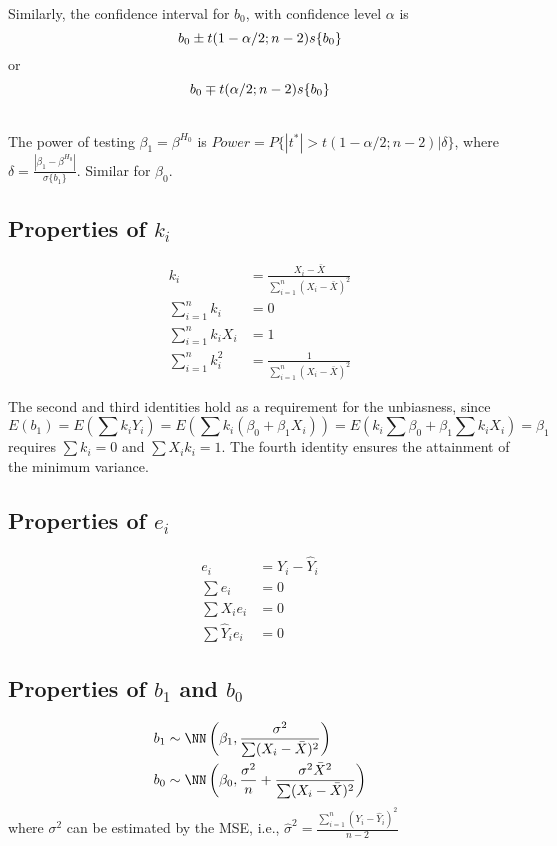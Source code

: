 \documentclass{memoir}
\begin{document}
Similarly, the confidence interval for $b_0$, with confidence level $\alpha$ is
\begin{equation}
	b_0 \pm t(1-\alpha/2;n-2)s\{b_0\}\\
\end{equation}
or
\begin{equation}
	b_0 \mp t(\alpha/2;n-2)s\{b_0\}\\
\end{equation}

\noindent
\\
The power of testing $\beta_1 = \beta^{H_0}$ is $Power = P\{|t^*|>t(1-\alpha/2;n-2)|\delta\}$, where $\delta = \frac{|\beta_1 - \beta^{H_0}|}{\sigma\{b_1\}}$. Similar for $\beta_0$.

\subsection{Properties of $k_i$}
\begin{align}
	k_i &= \frac{X_i - \bar X}{\sum_{i=1}^n (X_i-\bar X)^2}\\
	\sum_{i=1}^n k_i &= 0\\
	\sum_{i=1}^n k_i X_i &= 1\\
	\sum_{i=1}^n k_i^2 &= \frac{1}{\sum_{i=1}^n(X_i - \bar X)^2}
\end{align}

The second and third identities hold as a requirement for the unbiasness, since $$E(b_1) = E\left(\sum k_i Y_i\right)= E\left(\sum k_i (\beta_0+\beta_1 X_i)\right) = E\left(k_i \sum\beta_0 + \beta_1 \sum k_i X_i \right) = \beta_1$$ requires $\sum k_i = 0$  and $\sum X_i k_i = 1$.
The fourth identity ensures the attainment of the minimum variance.


\subsection{Properties of $e_i$}
\begin{align}
	e_i & = Y_i - \hat Y_i \\
	\sum e_i & = 0 \\
	\sum X_i e_i & = 0 \\
	\sum \hat Y_i e_i & = 0
\end{align}

\subsection{Properties of $b_1$ and $b_0$}
\begin{align}
	b_1 &\sim \NN \left(\beta_1,\frac{\sigma^2}{\sum(X_i-\bar X)^2}\right) \\
	b_0 &\sim \NN \left(\beta_0,\frac{\sigma^2}{n} + \frac{\sigma^2 {\bar X}^2}{\sum(X_i-\bar X)^2} \right)
\end{align}
where $\sigma^2$ can be estimated by the MSE, i.e., $\hat \sigma^2 = \frac{\sum_{i=1}^n (Y_i - \hat Y_i)^2}{n-2}$
\end{document}
